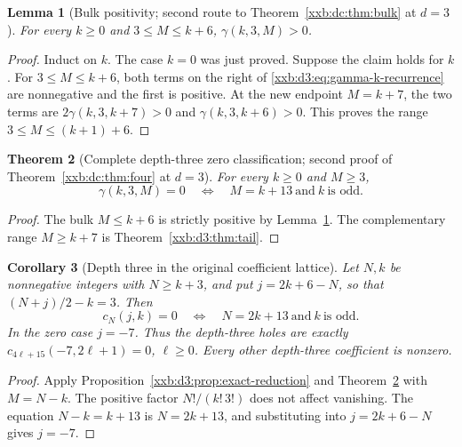 \documentclass[11pt,a4paper]{article}
\numberwithin{equation}{section}
\newtheorem{theorem}{Theorem}[section]
\newtheorem{lemma}[theorem]{Lemma}
\newtheorem{corollary}[theorem]{Corollary}
\theoremstyle{definition}
\theoremstyle{remark}
\theoremstyle{plain}
\begin{document}
\begin{lemma}[Bulk positivity; second route to Theorem~\ref{xxb:dc:thm:bulk} at $d=3$]
\label{xxb:d3:lem:bulk-positive}
For every $k\geq0$ and $3\leq M\leq k+6$, $\gamma(k,3,M)>0$.
\end{lemma}

\begin{proof}
Induct on $k$.  The case $k=0$ was just proved.  Suppose the claim holds for
$k$.  For $3\leq M\leq k+6$, both terms on the right of
\eqref{xxb:d3:eq:gamma-k-recurrence} are nonnegative and the first is
positive.  At the new endpoint $M=k+7$, the two terms are
$2\gamma(k,3,k+7)>0$ and $\gamma(k,3,k+6)>0$.  This proves the range
$3\leq M\leq(k+1)+6$.
\end{proof}

\begin{theorem}[Complete depth-three zero classification; second proof of Theorem~\ref{xxb:dc:thm:four} at $d=3$]
\label{xxb:d3:thm:main}
For every $k\geq0$ and $M\geq3$,
\begin{equation}
 \label{xxb:d3:eq:main-zero}
 \boxed{
 \gamma(k,3,M)=0
 \quad\Longleftrightarrow\quad
 M=k+13\ \text{and}\ k\ \text{is odd}.}
\end{equation}
\end{theorem}

\begin{proof}
The bulk $M\leq k+6$ is strictly positive by
Lemma~\ref{xxb:d3:lem:bulk-positive}.  The complementary range $M\geq k+7$ is
Theorem~\ref{xxb:d3:thm:tail}.
\end{proof}

\begin{corollary}[Depth three in the original coefficient lattice]
\label{xxb:d3:cor:lattice}
Let $N,k$ be nonnegative integers with $N\geq k+3$, and put $j=2k+6-N$, so
that $(N+j)/2-k=3$.  Then
\[
 c_N(j,k)=0
 \quad\Longleftrightarrow\quad
 N=2k+13\ \text{and}\ k\ \text{is odd}.
\]
In the zero case $j=-7$.  Thus the depth-three holes are exactly
$c_{4\ell+15}(-7,2\ell+1)=0$, $\ell\geq0$.
Every other depth-three coefficient is nonzero.
\end{corollary}

\begin{proof}
Apply Proposition~\ref{xxb:d3:prop:exact-reduction} and
Theorem~\ref{xxb:d3:thm:main} with $M=N-k$.  The positive factor $N!/(k!\,3!)$
does not affect vanishing.  The equation $N-k=k+13$ is $N=2k+13$, and
substituting into $j=2k+6-N$ gives $j=-7$.
\end{proof}
\end{document}

